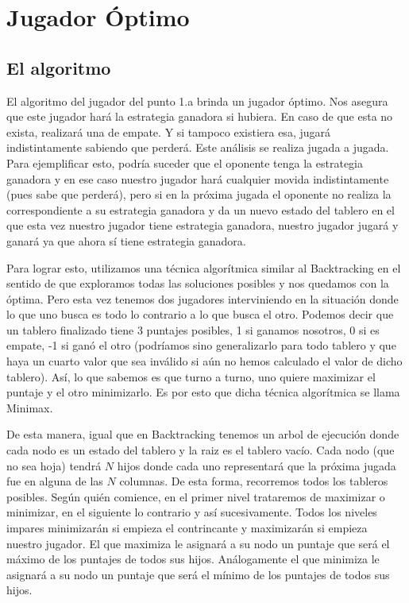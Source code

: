 \documentclass[A4paper,oneside,fleqn,11pt]{article}
\theoremstyle{definition}
\begin{document}
\section{Jugador Óptimo}

\subsection{El algoritmo}

El algoritmo del jugador del punto 1.a brinda un jugador óptimo. Nos asegura que este jugador hará la estrategia ganadora si hubiera. En caso de que esta no exista, realizará una de empate. Y si tampoco existiera esa, jugará indistintamente sabiendo que perderá. Este análisis se realiza jugada a jugada. Para ejemplificar esto, podría suceder que el oponente tenga la estrategia ganadora y en ese caso nuestro jugador hará cualquier movida indistintamente (pues sabe que perderá), pero si en la próxima jugada el oponente no realiza la correspondiente a su estrategia ganadora y da un nuevo estado del tablero en el que esta vez nuestro jugador tiene estrategia ganadora, nuestro jugador jugará y ganará ya que ahora sí tiene estrategia ganadora.

Para lograr esto, utilizamos una técnica algorítmica similar al Backtracking en el sentido de que exploramos todas las soluciones posibles y nos quedamos con la óptima. Pero esta vez tenemos dos jugadores interviniendo en la situación donde lo que uno busca es todo lo contrario a lo que busca el otro. Podemos decir que un tablero finalizado tiene 3 puntajes posibles, 1 si ganamos nosotros, 0 si es empate, -1 si ganó el otro (podríamos sino generalizarlo para todo tablero y que haya un cuarto valor que sea inválido si aún no hemos calculado el valor de dicho tablero). Así, lo que sabemos es que turno a turno, uno quiere maximizar el puntaje y el otro minimizarlo. Es por esto que dicha técnica algorítmica se llama Minimax. 

De esta manera, igual que en Backtracking tenemos un arbol de ejecución donde cada nodo es un estado del tablero y la raiz es el tablero vacío. Cada nodo (que no sea hoja) tendrá $N$ hijos donde cada uno representará que la próxima jugada fue en alguna de las $N$ columnas. De esta forma, recorremos todos los tableros posibles. Según quién comience, en el primer nivel trataremos de maximizar o minimizar, en el siguiente lo contrario y así sucesivamente. Todos los niveles impares minimizarán si empieza el contrincante y maximizarán si empieza nuestro jugador. El que maximiza le asignará a su nodo un puntaje que será el máximo de los puntajes de todos sus hijos. Análogamente el que minimiza le asignará a su nodo un puntaje que será el mínimo de los puntajes de todos sus hijos.
\end{document}
